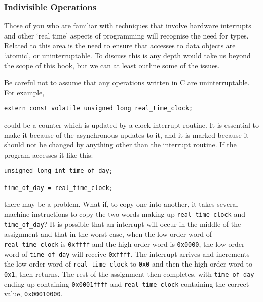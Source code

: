    \subsubsection{Indivisible Operations}
    

    Those of you who are familiar with techniques that involve hardware
     interrupts and other `real time' aspects of programming will
     recognise the need for \volatile{} types. Related to this
     area is the need to ensure that accesses to data objects are
     `atomic', or uninterruptable. To discuss this is any depth would
     take us beyond the scope of this book, but we can at least outline some
     of the issues.


    Be careful not to assume that any operations written in C are
     uninterruptable. For example,


\begin{Verbatim}
extern const volatile unsigned long real_time_clock;
\end{Verbatim}

    could be a counter which is updated by a clock interrupt routine. It
     is essential to make it \volatile{} because of the
     asynchronous updates to it, and it is marked \const{} because
     it should not be changed by anything other than the interrupt routine.
     If the program accesses it like this:


\begin{Verbatim}
unsigned long int time_of_day;

time_of_day = real_time_clock;
\end{Verbatim}

    there may be a problem. What if, to copy one \klong{} into
     another, it takes several machine instructions to copy the two words
     making up \texttt{real\_time\_clock} and \texttt{time\_of\_day}? It
     is possible that an interrupt will occur in the middle of the
     assignment and that in the worst case, when the low-order word of
     \texttt{real\_time\_clock} is \texttt{0xffff} and the high-order
     word is \texttt{0x0000}, the low-order word of
     \texttt{time\_of\_day} will receive \texttt{0xffff}. The
     interrupt arrives and increments the low-order word of
     \texttt{real\_time\_clock} to \texttt{0x0} and then the
     high-order word to \texttt{0x1}, then returns. The rest of the
     assignment then completes, with \texttt{time\_of\_day} ending up
     containing \texttt{0x0001ffff} and \texttt{real\_time\_clock}
     containing the correct value, \texttt{0x00010000}.


